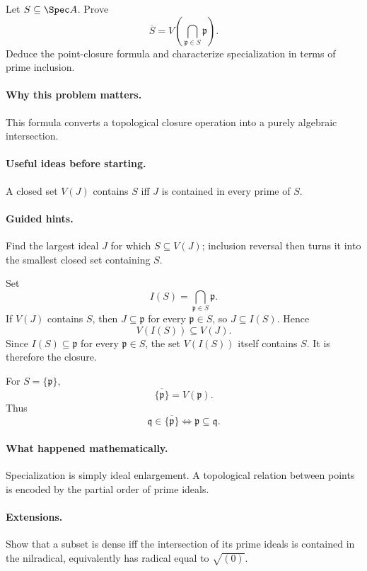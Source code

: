 \begin{problem}
Let $S\subseteq\Spec A$.  Prove
\[
\overline S
=
V\!\left(\bigcap_{\mathfrak p\in S}\mathfrak p\right).
\]
Deduce the point-closure formula and characterize specialization in terms of prime inclusion.
\end{problem}

\paragraph{Why this problem matters.}
This formula converts a topological closure operation into a purely algebraic intersection.

\paragraph{Useful ideas before starting.}
A closed set $V(J)$ contains $S$ iff $J$ is contained in every prime of $S$.

\paragraph{Guided hints.}
Find the largest ideal $J$ for which $S\subseteq V(J)$; inclusion reversal then turns it into
the smallest closed set containing $S$.

\begin{solution}
Set
\[
I(S)=\bigcap_{\mathfrak p\in S}\mathfrak p.
\]
If $V(J)$ contains $S$, then $J\subseteq\mathfrak p$ for every $\mathfrak p\in S$, so
$J\subseteq I(S)$.  Hence
\[
V(I(S))\subseteq V(J).
\]
Since $I(S)\subseteq\mathfrak p$ for every $\mathfrak p\in S$, the set $V(I(S))$ itself
contains $S$.  It is therefore the closure.

For $S=\{\mathfrak p\}$,
\[
\overline{\{\mathfrak p\}}=V(\mathfrak p).
\]
Thus
\[
\mathfrak q\in\overline{\{\mathfrak p\}}
\iff
\mathfrak p\subseteq\mathfrak q.
\]
\end{solution}

\paragraph{What happened mathematically.}
Specialization is simply ideal enlargement.  A topological relation between points is encoded
by the partial order of prime ideals.

\paragraph{Extensions.}
Show that a subset is dense iff the intersection of its prime ideals is contained in the
nilradical, equivalently has radical equal to $\sqrt{(0)}$.
